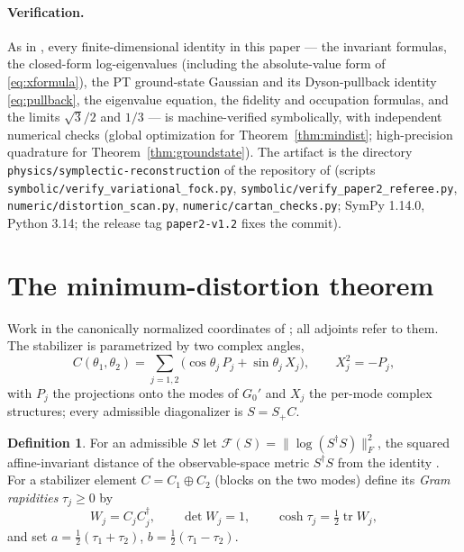 \documentclass[11pt]{article}
\theoremstyle{definition}
\newtheorem{definition}[theorem]{Definition}
\theoremstyle{remark}
\newcommand{\tr}{\operatorname{tr}}
\newcommand{\dg}{\dagger}
\begin{document}
\paragraph{Verification.}
As in \cite{companion}, every finite-dimensional identity in this paper ---
the invariant formulas, the closed-form log-eigenvalues (including the
absolute-value form of \eqref{eq:xformula}), the PT ground-state
Gaussian and its Dyson-pullback identity \eqref{eq:pullback}, the
eigenvalue equation, the fidelity and occupation formulas, and
the limits $\sqrt3/2$ and $1/3$ --- is machine-verified symbolically, with
independent numerical checks (global optimization for
Theorem~\ref{thm:mindist}; high-precision quadrature for
Theorem~\ref{thm:groundstate}).  The artifact is the directory
\texttt{physics/symplectic-reconstruction} of the repository of
\cite{companion} (scripts \texttt{symbolic/verify\_variational\_fock.py},
\texttt{symbolic/verify\_paper2\_referee.py},
\texttt{numeric/distortion\_scan.py}, \texttt{numeric/cartan\_checks.py};
SymPy 1.14.0, Python 3.14; the release tag \texttt{paper2-v1.2} fixes the
commit).

\section{The minimum-distortion theorem}\label{sec:mindist}

Work in the canonically normalized coordinates of \cite{companion}; all
adjoints refer to them.  The stabilizer is parametrized by two complex
angles,
\begin{equation}
C(\theta_1,\theta_2)=\sum_{j=1,2}\big(\cos\theta_j\,P_j+\sin\theta_j\,X_j\big),
\qquad X_j^2=-P_j ,
\end{equation}
with $P_j$ the projections onto the modes of $G_0'$ and $X_j$ the per-mode
complex structures; every admissible diagonalizer is $S=S_+C$.

\begin{definition}
For an admissible $S$ let
$\mathcal F(S)=\|\log(S^{\dg}S)\|_F^2$, the squared affine-invariant distance
of the observable-space metric $S^{\dg}S$ from the identity
\cite{Bhatia2007}.  For a stabilizer element $C=C_1\oplus C_2$ (blocks on the
two modes) define its \emph{Gram rapidities} $\tau_j\ge0$ by
\begin{equation}
W_j=C_jC_j^{\dg},\qquad \det W_j=1,\qquad
\cosh\tau_j=\tfrac12\tr W_j ,
\end{equation}
and set $a=\tfrac12(\tau_1+\tau_2)$, $b=\tfrac12(\tau_1-\tau_2)$.
\end{definition}
\end{document}
